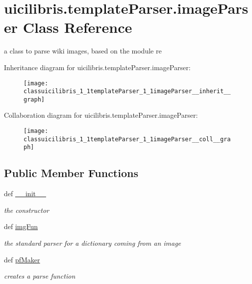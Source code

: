 \hypertarget{classuicilibris_1_1templateParser_1_1imageParser}{\section{uicilibris.\-template\-Parser.\-image\-Parser \-Class \-Reference}
\label{classuicilibris_1_1templateParser_1_1imageParser}
}


a class to parse wiki images, based on the module re  




\-Inheritance diagram for uicilibris.\-template\-Parser.\-image\-Parser\-:
\nopagebreak
\begin{figure}[H]
\begin{center}
\leavevmode
\texttt{[image: classuicilibris\_1\_1templateParser\_1\_1imageParser\_\_inherit\_\_graph]}
\end{center}
\end{figure}


\-Collaboration diagram for uicilibris.\-template\-Parser.\-image\-Parser\-:
\nopagebreak
\begin{figure}[H]
\begin{center}
\leavevmode
\texttt{[image: classuicilibris\_1\_1templateParser\_1\_1imageParser\_\_coll\_\_graph]}
\end{center}
\end{figure}
\subsection*{\-Public \-Member \-Functions}
\begin{DoxyCompactItemize}
\item 
def \hyperlink{classuicilibris_1_1templateParser_1_1imageParser_a4cc5f3b8d724bfa80ee95471c5abef2f}{\-\_\-\-\_\-init\-\_\-\-\_\-}
\begin{DoxyCompactList}\small\item\em the constructor \end{DoxyCompactList}\item 
def \hyperlink{classuicilibris_1_1templateParser_1_1imageParser_a1537fa3c112db90c76428bb8d81ae876}{img\-Fun}
\begin{DoxyCompactList}\small\item\em the standard parser for a dictionary coming from an image \end{DoxyCompactList}\item 
def \hyperlink{classuicilibris_1_1templateParser_1_1imageParser_aea563d5172ebb0554783f636267b1e5f}{pf\-Maker}
\begin{DoxyCompactList}\small\item\em creates a parse function \end{DoxyCompactList}\end{DoxyCompactItemize}
